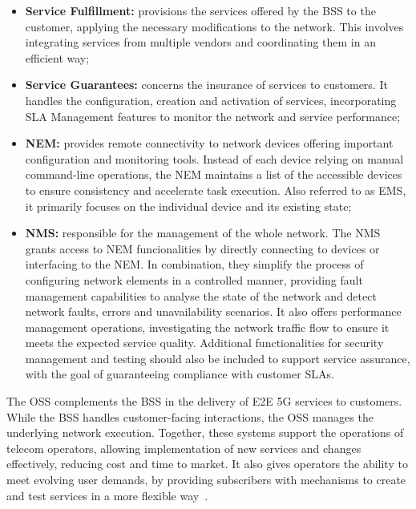 \begin{itemize}

    \item \textbf{Service Fulfillment:} provisions the services offered by the \acs{BSS} to the customer, applying the necessary modifications to the network. This involves integrating services from multiple vendors and coordinating them in an efficient way;

    \item \textbf{Service Guarantees:} concerns the insurance of services to customers. It handles the configuration, creation and activation of services, incorporating \acs{SLA} Management features to monitor the network and service performance;

    \item \textbf{\acf{NEM}:} provides remote connectivity to network devices offering important configuration and monitoring tools. Instead of each device relying on manual command-line operations, the \acs{NEM} maintains a list of the accessible devices to ensure consistency and accelerate task execution. Also referred to as \acf{EMS}, it primarily focuses on the individual device and its existing state;

    \item \textbf{\acf{NMS}:} responsible for the management of the whole network. The \acs{NMS} grants access to \acs{NEM} funcionalities by directly connecting to devices or interfacing to the \acs{NEM}. In combination, they simplify the process of configuring network elements in a controlled manner, providing fault management capabilities to analyse the state of the network and detect network faults, errors and unavailability scenarios. It also offers performance management operations, investigating the network traffic flow to ensure it meets the expected service quality. Additional functionalities for security management and testing should also be included to support service assurance, with the goal of guaranteeing compliance with customer \acsp{SLA}.

\end{itemize}

The \acs{OSS} complements the \acs{BSS} in the delivery of \acs{E2E} \acs{5G} services to customers. While the \acs{BSS} handles customer-facing interactions, the \acs{OSS} manages the underlying network execution. Together, these systems support the operations of telecom operators, allowing implementation of new services and changes effectively, reducing cost and time to market. It also gives operators the ability to meet evolving user demands, by providing subscribers with mechanisms to create and test services in a more flexible way~\cite{EricsonOSS}.

